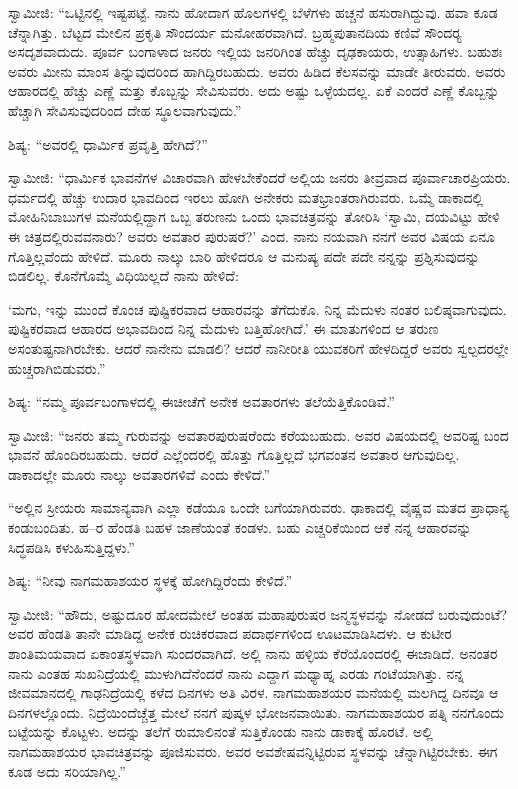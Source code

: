  ಸ್ವಾಮೀಜಿ: “ಒಟ್ಟಿನಲ್ಲಿ ಇಷ್ಟಪಟ್ಟೆ. ನಾನು ಹೋದಾಗ ಹೊಲಗಳಲ್ಲಿ ಬೆಳೆಗಳು ಹಚ್ಚನೆ ಹಸುರಾಗಿದ್ದುವು. ಹವಾ ಕೂಡ ಚೆನ್ನಾಗಿತ್ತು. ಬೆಟ್ಟದ ಮೇಲಿನ ಪ್ರಕೃತಿ ಸೌಂದರ್ಯ ಮನೋಹರವಾಗಿದೆ. ಬ್ರಹ್ಮಪುತಾನದಿಯ ಕಣಿವೆ ಸೌಂದರ‍್ಯ ಅಸದೃಶವಾದುದು. ಪೂರ್ವ ಬಂಗಾಳಾದ ಜನರು ಇಲ್ಲಿಯ ಜನರಿಗಿಂತ ಹೆಚ್ಚು ದೃಢಕಾಯರು, ಉತ್ಸಾಹಿಗಳು. ಬಹುಶಃ ಅವರು ಮೀನು ಮಾಂಸ ತಿನ್ನುವುದರಿಂದ ಹಾಗಿದ್ದಿರಬಹುದು. ಅವರು ಹಿಡಿದ ಕೆಲಸವನ್ನು ಮಾಡೇ ತೀರುವರು. ಅವರು ಆಹಾರದಲ್ಲಿ ಹೆಚ್ಚು ಎಣ್ಣೆ ಮತ್ತು ಕೊಬ್ಬನ್ನು ಸೇವಿಸುವರು. ಅದು ಅಷ್ಟು ಒಳ್ಳೆಯದಲ್ಲ. ಏಕೆ ಎಂದರೆ ಎಣ್ಣೆ ಕೊಬ್ಬನ್ನು ಹೆಚ್ಚಾಗಿ ಸೇವಿಸುವುದರಿಂದ ದೇಹ ಸ್ಥೂಲವಾಗುವುದು.” 

 ಶಿಷ್ಯ: “ಅವರಲ್ಲಿ ಧಾರ್ಮಿಕ ಪ್ರವೃತ್ತಿ ಹೇಗಿದೆ?” 

 ಸ್ವಾಮೀಜಿ: “ಧಾರ್ಮಿಕ ಭಾವನೆಗಳ ವಿಚಾರವಾಗಿ ಹೇಳಬೇಕೆಂದರೆ ಅಲ್ಲಿಯ ಜನರು ತೀವ್ರವಾದ ಪೂರ್ವಾಚಾರಪ್ರಿಯರು. ಧರ್ಮದಲ್ಲಿ ಹೆಚ್ಚು ಉದಾರ ಭಾವದಿಂದ ಇರಲು ಹೋಗಿ ಅನೇಕರು ಮತಭ್ರಾಂತರಾಗಿರುವರು. ಒಮ್ಮೆ ಡಾಕಾದಲ್ಲಿ ಮೋಹಿನಿಬಾಬುಗಳ ಮನೆಯಲ್ಲಿದ್ದಾಗ ಒಬ್ಬ ತರುಣನು ಒಂದು ಭಾವಚಿತ್ರವನ್ನು ತೋರಿಸಿ ‘ಸ್ವಾಮಿ, ದಯವಿಟ್ಟು ಹೇಳಿ ಈ ಚಿತ್ರದಲ್ಲಿರುವವನಾರು? ಅವರು ಅವತಾರ ಪುರುಷರೆ?’ ಎಂದ. ನಾನು ನಯವಾಗಿ ನನಗೆ ಅವರ ವಿಷಯ ಏನೂ ಗೊತ್ತಿಲ್ಲವೆಂದು ಹೇಳಿದೆ. ಮೂರು ನಾಲ್ಕು ಬಾರಿ ಹೇಳಿದರೂ ಆ ಮನುಷ್ಯ ಪದೇ ಪದೇ ನನ್ನನ್ನು ಪ್ರಶ್ನಿಸುವುದನ್ನು ಬಿಡಲಿಲ್ಲ. ಕೊನೆಗೊಮ್ಮೆ ವಿಧಿಯಿಲ್ಲದೆ ನಾನು ಹೇಳಿದೆ: 

 ‘ಮಗು, ಇನ್ನು ಮುಂದೆ ಕೊಂಚ ಪುಷ್ಟಿಕರವಾದ ಆಹಾರವನ್ನು ತೆಗೆದುಕೊ. ನಿನ್ನ ಮೆದುಳು ನಂತರ ಬಲಿಷ್ಠವಾಗುವುದು. ಪುಷ್ಟಿಕರವಾದ ಆಹಾರದ ಅಭಾವದಿಂದ ನಿನ್ನ ಮೆದುಳು ಬತ್ತಿಹೋಗಿದೆ.’ ಈ ಮಾತುಗಳಿಂದ ಆ ತರುಣ ಅಸಂತುಷ್ಟನಾಗಿರಬೇಕು. ಆದರೆ ನಾನೇನು ಮಾಡಲಿ? ಆದರೆ ನಾನೀರೀತಿ ಯುವಕರಿಗೆ ಹೇಳದಿದ್ದರೆ ಅವರು ಸ್ವಲ್ಪದರಲ್ಲೇ ಹುಚ್ಚರಾಗಿಬಿಡುವರು.” 

 ಶಿಷ್ಯ: “ನಮ್ಮ ಪೂರ್ವಬಂಗಾಳದಲ್ಲಿ ಈಚೀಚೆಗೆ ಅನೇಕ ಅವತಾರಗಳು ತಲೆಯೆತ್ತಿಕೊಂಡಿವೆ.” 

 ಸ್ವಾಮೀಜಿ: “ಜನರು ತಮ್ಮ ಗುರುವನ್ನು ಅವತಾರಪುರುಷರೆಂದು ಕರೆಯಬಹುದು. ಅವರ ವಿಷಯದಲ್ಲಿ ಅವರಿಷ್ಟ ಬಂದ ಭಾವನೆ ಹೊಂದಿರಬಹುದು. ಆದರೆ ಎಲ್ಲೆಂದರಲ್ಲಿ ಹೊತ್ತು ಗೊತ್ತಿಲ್ಲದೆ ಭಗವಂತನ ಅವತಾರ ಆಗುವುದಿಲ್ಲ. ಡಾಕಾದಲ್ಲೇ ಮೂರು ನಾಲ್ಕು ಅವತಾರಗಳಿವೆ ಎಂದು ಕೇಳಿದೆ.” 

 “ಅಲ್ಲಿನ ಸ್ರೀಯರು ಸಾಮಾನ್ಯವಾಗಿ ಎಲ್ಲಾ ಕಡೆಯೂ ಒಂದೇ ಬಗೆಯಾಗಿರುವರು. ಢಾಕಾದಲ್ಲಿ ವೈಷ್ಣವ ಮತದ ಪ್ರಾಧಾನ್ಯ ಕಂಡುಬಂದಿತು. ಹ–ರ ಹೆಂಡತಿ ಬಹಳ ಜಾಣೆಯಂತೆ ಕಂಡಳು. ಬಹು ಎಚ್ಚರಿಕೆಯಿಂದ ಆಕೆ ನನ್ನ ಆಹಾರವನ್ನು ಸಿದ್ಧಪಡಿಸಿ ಕಳುಹಿಸುತ್ತಿದ್ದಳು.” 

 ಶಿಷ್ಯ: “ನೀವು ನಾಗಮಹಾಶಯರ ಸ್ಥಳಕ್ಕೆ ಹೋಗಿದ್ದಿರೆಂದು ಕೇಳಿದೆ.” 

 ಸ್ವಾಮೀಜಿ: “ಹೌದು, ಅಷ್ಟುದೂರ ಹೋದಮೇಲೆ ಅಂತಹ ಮಹಾಪುರುಷರ ಜನ್ಮಸ್ಥಳವನ್ನು ನೋಡದೆ ಬರುವುದುಂಟೆ? ಅವರ ಹೆಂಡತಿ ತಾನೇ ಮಾಡಿದ್ದ ಅನೇಕ ರುಚಿಕರವಾದ ಪದಾರ್ಥಗಳಿಂದ ಊಟಮಾಡಿಸಿದಳು. ಆ ಕುಟೀರ ಶಾಂತಿಮಯವಾದ ಏಕಾಂತಸ್ಥಳವಾಗಿ ಸುಂದರವಾಗಿದೆ. ಅಲ್ಲಿ ನಾನು ಹಳ್ಳಿಯ ಕೆರೆಯೊಂದರಲ್ಲಿ ಈಜಾಡಿದೆ. ಅನಂತರ ನಾನು ಎಂತಹ ಸುಖನಿದ್ರೆಯಲ್ಲಿ ಮುಳುಗಿದೆನೆಂದರೆ ನಾನು ಎದ್ದಾಗ ಮಧ್ಯಾಹ್ನ ಎರಡು ಗಂಟೆಯಾಗಿತ್ತು. ನನ್ನ ಜೀವಮಾನದಲ್ಲಿ ಗಾಢನಿದ್ರೆಯಲ್ಲಿ ಕಳೆದ ದಿನಗಳು ಅತಿ ವಿರಳ. ನಾಗಮಹಾಶಯರ ಮನೆಯಲ್ಲಿ ಮಲಗಿದ್ದ ದಿನವೂ ಆ ದಿನಗಳಲ್ಲೊಂದು. ನಿದ್ರೆಯಿಂದೆಚ್ಚೆತ್ತ ಮೇಲೆ ನನಗೆ ಪುಷ್ಕಳ ಭೋಜನವಾಯಿತು. ನಾಗಮಹಾಶಯರ ಪತ್ನಿ ನನಗೊಂದು ಬಟ್ಟೆಯನ್ನು ಕೊಟ್ಟಳು. ಅದನ್ನು ತಲೆಗೆ ರುಮಾಲಿನಂತೆ ಸುತ್ತಿಕೊಂಡು ನಾನು ಡಾಕಾಕ್ಕೆ ಹೊರಟೆ. ಅಲ್ಲಿ ನಾಗಮಹಾಶಯರ ಭಾವಚಿತ್ರವನ್ನು ಪೂಜಿಸುವರು. ಅವರ ಅವಶೇಷವನ್ನಿಟ್ಟಿರುವ ಸ್ಥಳವನ್ನು ಚೆನ್ನಾಗಿಟ್ಟಿರಬೇಕು. ಈಗ ಕೂಡ ಅದು ಸರಿಯಾಗಿಲ್ಲ.” 

